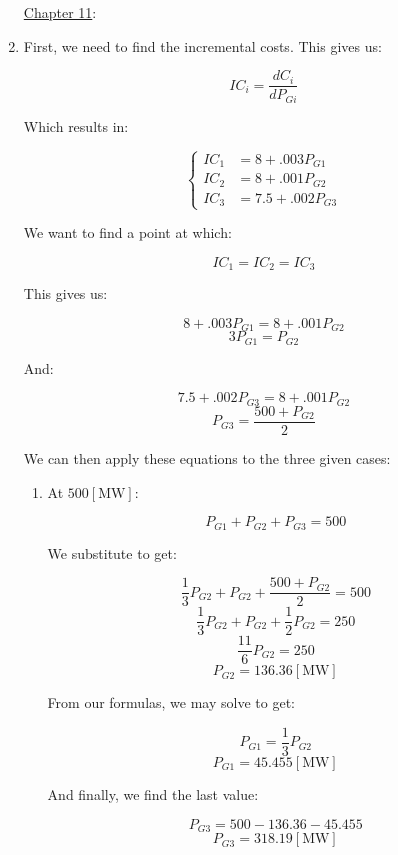 \begin{enumerate}

    \begin{center}
      \underline{Chapter 11}:
    \end{center}

    \setcounter{enumi}{7}

  \item First, we need to find the incremental costs. This gives us:

    $$IC_i=\frac{dC_i}{dP_{Gi}}$$

    Which results in:

    $$\left\{\begin{array}{ll} IC_1&= 8+.003P_{G1}\\IC_{2}&= 8+.001P_{G2}\\IC_{3}&= 7.5 + .002P_{G3}\end{array}$$

      We want to find a point at which:

      $$IC_{1}=IC_{2}=IC_{3}$$

      This gives us:

      $$8+.003P_{G1}=8+.001P_{G2}$$
      $$3P_{G1}=P_{G2}$$

      And:

      $$7.5+.002P_{G3}=8+.001P_{G2}$$
      $$P_{G3}=\frac{500+P_{G2}}{2}$$

      We can then apply these equations to the three given cases:

    \begin{enumerate}

      \item At $500[\si{\mega\watt}]$:

        $$P_{G1}+P_{G2}+P_{G3}=500$$

        We substitute to get:

        $$\frac{1}{3}P_{G2}+P_{G2}+\frac{500+P_{G2}}{2}=500$$
        $$\frac{1}{3}P_{G2}+P_{G2}+\frac{1}{2}P_{G2}=250$$
        $$\frac{11}{6}P_{G2}=250$$
        $$\boxed{P_{G2}=136.36[\si{\mega\watt}]}$$

        From our formulas, we may solve to get:

        $$P_{G1}=\frac{1}{3}P_{G2}$$
        $$\boxed{P_{G1}=45.455[\si{\mega\watt}]}$$

        And finally, we find the last value:

        $$P_{G3}=500-136.36-45.455$$
        $$\boxed{P_{G3}=318.19[\si{\mega\watt}]}$$


\end{enumerate}
\end{enumerate}
